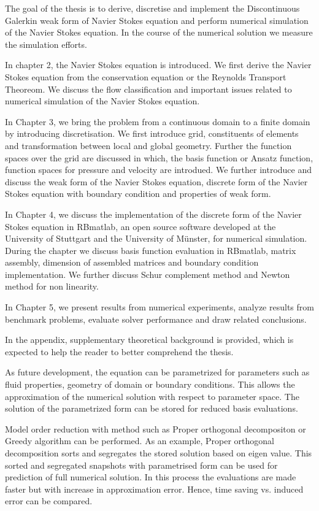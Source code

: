 \documentclass[a4paper,12pt]{book}
\begin{document}
The goal of the thesis is to derive, discretise and implement the Discontinuous Galerkin weak form of Navier Stokes equation and perform numerical simulation of the Navier Stokes equation. In the course of the numerical solution we measure the simulation efforts.

In chapter 2, the Navier Stokes equation is introduced. We first derive the Navier Stokes equation from the conservation equation or the Reynolds Transport Theoreom. We discuss the flow classification and important issues related to numerical simulation of the Navier Stokes equation. 

In Chapter 3, we bring the problem from a continuous domain to a finite domain by introducing discretisation. We first introduce grid, constituents of elements and transformation between local and global geometry. Further the function spaces over the grid are discussed in which, the basis function or Ansatz function, function spaces for pressure and velocity are introdued. We further introduce and discuss the weak form of the Navier Stokes equation, discrete form of the Navier Stokes equation with boundary condition and properties of weak form.

In Chapter 4, we discuss the implementation of the discrete form of the Navier Stokes equation in RBmatlab, an open source software developed at the University of Stuttgart and the University of M\"unster, for numerical simulation. During the chapter we discuss basis function evaluation in RBmatlab, matrix assembly, dimension of assembled matrices and boundary condition implementation. We further discuss Schur complement method and Newton method for non linearity.

In Chapter 5, we present results from numerical experiments, analyze results from benchmark problems, evaluate solver performance and draw related conclusions.

In the appendix, supplementary theoretical background is provided, which is expected to help the reader to better comprehend the thesis.

As future development, the equation can be parametrized for parameters such as fluid properties, geometry of domain or boundary conditions. This allows the approximation of the numerical solution with respect to parameter space. The solution of the parametrized form can be stored for reduced basis evaluations.

Model order reduction with method such as Proper orthogonal decompositon or Greedy algorithm can be performed. As an example, Proper orthogonal decomposition sorts and segregates the stored solution based on eigen value. This sorted and segregated snapshots with parametrised form can be used for prediction of full numerical solution. In this process the evaluations are made faster but with increase in approximation error. Hence, time saving vs. induced error can be compared.
\end{document}
